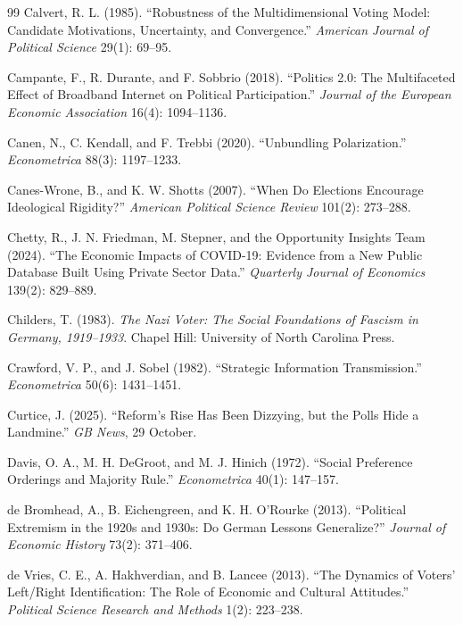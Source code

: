 \documentclass[12pt,letterpaper]{article}
\begin{document}
\begin{thebibliography}{99}
Calvert, R. L. (1985). ``Robustness of the Multidimensional Voting Model: Candidate Motivations, Uncertainty, and Convergence.'' \textit{American Journal of Political Science} 29(1): 69--95.

Campante, F., R. Durante, and F. Sobbrio (2018). ``Politics 2.0: The Multifaceted Effect of Broadband Internet on Political Participation.'' \textit{Journal of the European Economic Association} 16(4): 1094--1136.

Canen, N., C. Kendall, and F. Trebbi (2020). ``Unbundling Polarization.'' \textit{Econometrica} 88(3): 1197--1233.

Canes-Wrone, B., and K. W. Shotts (2007). ``When Do Elections Encourage Ideological Rigidity?'' \textit{American Political Science Review} 101(2): 273--288.

Chetty, R., J. N. Friedman, M. Stepner, and the Opportunity Insights Team (2024). ``The Economic Impacts of COVID-19: Evidence from a New Public Database Built Using Private Sector Data.'' \textit{Quarterly Journal of Economics} 139(2): 829--889.

Childers, T. (1983). \textit{The Nazi Voter: The Social Foundations of Fascism in Germany, 1919--1933}. Chapel Hill: University of North Carolina Press.

Crawford, V. P., and J. Sobel (1982). ``Strategic Information Transmission.'' \textit{Econometrica} 50(6): 1431--1451.

Curtice, J. (2025). ``Reform's Rise Has Been Dizzying, but the Polls Hide a Landmine.'' \textit{GB News}, 29 October.

Davis, O. A., M. H. DeGroot, and M. J. Hinich (1972). ``Social Preference Orderings and Majority Rule.'' \textit{Econometrica} 40(1): 147--157.

de Bromhead, A., B. Eichengreen, and K. H. O'Rourke (2013). ``Political Extremism in the 1920s and 1930s: Do German Lessons Generalize?'' \textit{Journal of Economic History} 73(2): 371--406.

de Vries, C. E., A. Hakhverdian, and B. Lancee (2013). ``The Dynamics of Voters' Left/Right Identification: The Role of Economic and Cultural Attitudes.'' \textit{Political Science Research and Methods} 1(2): 223--238.


\end{thebibliography}
\end{document}
